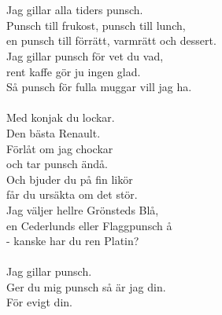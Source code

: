 {\footnotesize{}}\\
\\
Jag gillar alla tiders punsch.\\
Punsch till frukost, punsch till lunch,\\
en punsch till förrätt, varmrätt och dessert.\\
Jag gillar punsch för vet du vad,\\
rent kaffe gör ju ingen glad.\\
Så punsch för fulla muggar vill jag ha.\\
\\
Med konjak du lockar.\\
Den bästa Renault.\\
Förlåt om jag chockar\\
och tar punsch ändå.\\
Och bjuder du på fin likör\\
får du ursäkta om det stör.\\
Jag väljer hellre Grönsteds Blå,\\
en Cederlunds eller Flaggpunsch å\\
 - kanske har du ren Platin?\\
\\
Jag gillar punsch.\\
Ger du mig punsch så är jag din.\\
För evigt din.
